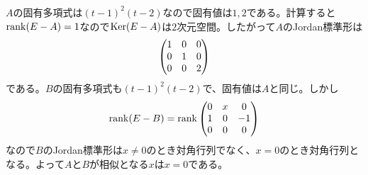 \newpage

\subsubsection{}%
\begin{sol}
  $A$の固有多項式は$(t-1)^2(t-2)$なので固有値は$1,2$である。計算すると$\operatorname{rank} (E - A)=1$なので$\operatorname{Ker} (E-A)$は$2$次元空間。したがって$A$のJordan標準形は
  \[
  \begin{pmatrix}  1 &0& 0 \\ 0& 1& 0 \\ 0& 0& 2 \end{pmatrix}
  \]
  である。$B$の固有多項式も$(t-1)^2(t-2)$で、固有値は$A$と同じ。しかし
  \[
  \operatorname{rank} (E-B) = \operatorname{rank} \begin{pmatrix}  0 &x& 0 \\ 1& 0& -1 \\ 0& 0 &0 \end{pmatrix}
  \]
  なので$B$のJordan標準形は$x \neq 0$のとき対角行列でなく、$x=0$のとき対角行列となる。よって$A$と$B$が相似となる$x$は$x=0$である。
\end{sol}
